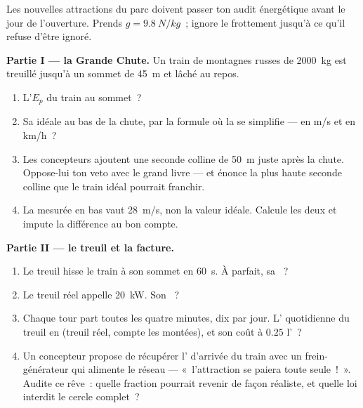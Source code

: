 \begin{problem}\label{pb:g9:energy-conversions:1}
Les nouvelles attractions du parc doivent passer ton audit énergétique
avant le jour de l'ouverture. Prends $g = \qty{9.8}{N/kg}$~; ignore
le frottement jusqu'à ce qu'il refuse d'être ignoré.

\medskip\noindent\textbf{Partie I --- la Grande Chute.}
Un train de montagnes russes de \qty{2000}{kg} est treuillé jusqu'à un
sommet de \qty{45}{m} et lâché au repos.
\begin{enumerate}
  \item L'$E_p$ du train au sommet~?
  \item Sa  idéale au bas de la chute, par la formule où la
         se simplifie --- en \unit{m/s} et en \unit{km/h}~?
  \item Les concepteurs ajoutent une seconde colline de \qty{50}{m}
        juste après la chute. Oppose-lui ton veto avec le grand
        livre --- et énonce la plus haute seconde colline que le
        train idéal pourrait franchir.
  \item La  mesurée en bas vaut \qty{28}{m/s}, non la
        valeur idéale. Calcule les deux  et
        impute la différence au bon compte.
\end{enumerate}

\medskip\noindent\textbf{Partie II --- le treuil et la facture.}
\begin{enumerate}[resume]
  \item Le treuil hisse le train à son sommet en \qty{60}{s}. À
         parfait, sa ~?
  \item Le treuil réel appelle \qty{20}{kW}. Son ~?
  \item Chaque tour part toutes les quatre minutes, dix  par
        jour. L' quotidienne du treuil en 
        (treuil réel, compte les montées), et son coût à $0.25$
        l'~?
  \item Un concepteur propose de récupérer l' d'arrivée du
        train avec un frein-générateur qui alimente le réseau ---
        «~l'attraction se paiera toute seule~!~». Audite ce rêve~:
        quelle fraction pourrait revenir de façon réaliste, et
        quelle loi interdit le cercle complet~?
\end{enumerate}


\end{problem}
